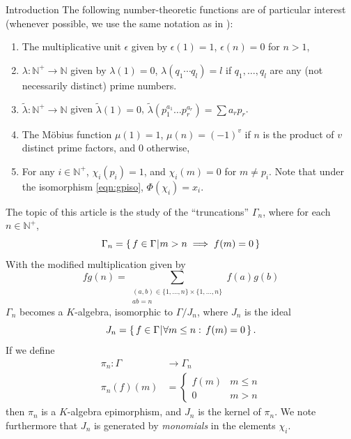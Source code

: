 \documentclass[reqno,10pt]{amsart}
\theoremstyle{definition}
\theoremstyle{remark}
\theoremstyle{plain}
\newcommand{\Nat}{{\mathbb{N}}}
\def\setsuchas#1#2{\left\{\,{#1}\,\vrule\,{#2}\,\right\}}
\newcommand{\set}[1]{{\{#1\}}}
\begin{document}
\begin{section}{Introduction}
  The following
  number-theoretic functions are of particular interest (whenever
  possible, we use the same 
  notation as in \cite{NumThe}): 
  \begin{enumerate}
  \item The multiplicative unit \(\epsilon\) given by
    \(\epsilon(1)=1\), \(\epsilon(n) = 0\) for \(n > 1\),
  \item
    \(\lambda: \Nat^+ \to \Nat\) given by
    \(\lambda(1)=0\), \(\lambda(q_1\cdots q_l)=l\) if \(q_1,\dots,q_l\)
    are any (not necessarily distinct) prime numbers.
  \item     \(\tilde{\lambda}: \Nat^+ \to \Nat\) given \(\tilde{\lambda}(1)=0\),
    \(\tilde{\lambda}(p_1^{a_1} \dots p_r^{a_r}) = \sum a_r p_r\). 
  \item The M\"obius function \(\mu(1) = 1\), \(\mu(n) = (-1)^v\) if
    \(n\) is the product of \(v\) distinct prime factors, and \(0\)
    otherwise, 
  \item   For any \(i \in \Nat^+\),
  \(\chi_i(p_i) = 1\), and \(\chi_i(m)=0\) for \(m \neq p_i\). 
  Note that under the isomorphism \eqref{eqn:gpiso},
  \(\Phi(\chi_i)=x_i\). 
  \end{enumerate}


  The topic of this article is the study of the ``truncations''
  \(\Gamma_n\), where for each \(n \in \Nat^+\),
  \begin{equation}\label{eq:defgamman}
    \Gamma_n = \setsuchas{f \in \Gamma}{m > n \implies f(m) = 0}
  \end{equation}
  With the modified multiplication given by 
  \begin{equation}
    fg(n) = \sum_{\substack{(a,b) \in {\set{1,\dots,n}} \times {\set{1,\dots,n}}
    \\ab=n}} 
    f(a)g(b) 
  \end{equation}
  \(\Gamma_n\) becomes a \(K\)-algebra, isomorphic to \(\Gamma/J_n\), where
  \(J_n\) is the ideal 
  \[J_n=\setsuchas{f \in \Gamma}{\forall m \le n: \,
    f(m)=0}.\]
  If we define
  \begin{align}\label{eq:gammamap}
    \pi_n: \Gamma &\to \Gamma_n \\
    \pi_n(f)(m)  & = 
    \begin{cases}
      f(m) & m \le n \\
      0 & m > n
    \end{cases}
  \end{align}
  then \(\pi_n\) is a \(K\)-algebra epimorphism, and \(J_n\) is the kernel of
  \(\pi_n\). 
  We note furthermore that \(J_n\) is
  generated by \emph{monomials} in the elements \(\chi_i\).
  

\end{section}
\end{document}
